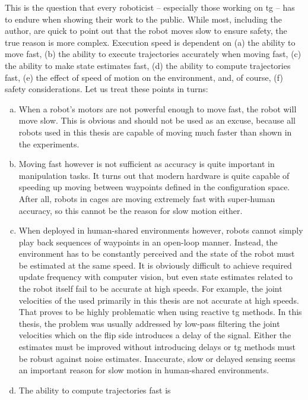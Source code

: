 This is the question that every roboticist
-- especially those working on \ac{tg} --
has to endure when showing their work to the public. While most, including the
author, are quick to point out that the robot moves slow to ensure safety, the
true reason is more complex. Execution speed is dependent on
(a) the ability to move fast,
(b) the ability to execute trajectories accurately when moving fast,
(c) the ability to make state estimates fast,
(d) the ability to compute trajectories fast,
(e) the effect of speed of motion on the environment,
and, of course,  (f) safety considerations.
Let us treat these
points in turns:
\begin{enumerate}[(a)]
  \item When a robot's motors are not powerful enough to
    move fast, the robot will move slow. This is obvious and
    should not be used as an excuse, because all robots used
    in this thesis are capable of moving much faster than
    shown in the experiments. 
  \item Moving fast however is not sufficient as accuracy
    is quite important in manipulation tasks. It turns out
    that modern hardware is quite capable of speeding up
    moving between waypoints defined in the configuration
    space. After all,
    robots in cages are moving extremely fast with
    super-human accuracy, so this cannot be the reason for
    slow motion either.
  \item When deployed in human-shared environments however,
    robots cannot simply play back sequences of waypoints in
    an open-loop manner. Instead, the environment has to be
    constantly perceived and the state of the robot must be
    estimated at the same speed. It is obviously difficult
    to achieve required update frequency with computer
    vision, but even state estimates related to the robot
    itself fail to be accurate at high speeds. For example,
    the joint velocities of the \panda{} used primarily
    in this thesis are not accurate at high speeds. That
    proves to be highly problematic when using reactive
    \ac{tg} methods. In this thesis, the problem was usually
    addressed by low-pass filtering the joint velocities
    which on the flip side introduces a delay of the signal.
    Either the estimates must be improved without
    introducing delays or \ac{tg} methods must be robust
    against noise estimates. Inaccurate, slow or delayed
    sensing seems an important reason for slow motion in
    human-shared environments.
  \item The ability to compute trajectories fast is

\end{enumerate}
